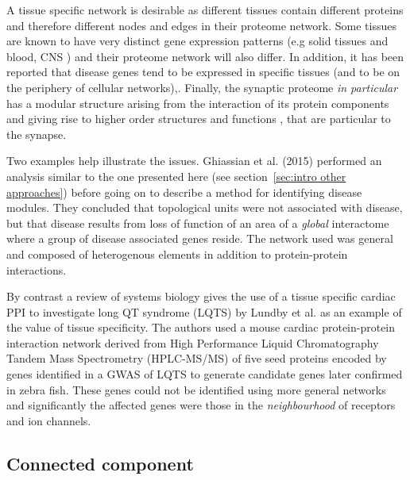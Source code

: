 A tissue specific network is desirable as different tissues contain different proteins and therefore different nodes and edges in their proteome network.  Some tissues are known to have very distinct gene expression patterns (e.g solid tissues and blood, CNS \cite{mele2015human}) and their proteome network will also differ. In addition, it has been reported that disease genes tend to be expressed in specific tissues (and to be on the periphery of cellular networks)\cite{barabasi2011network},\cite{kitsak2016tissue}. Finally, the synaptic proteome \textit{in particular} has a modular structure arising from the interaction of its protein components and giving rise to higher order structures and functions \cite{pocklington2006organization},\cite{grant2012synaptopathies} that are particular to the synapse. 

Two examples help illustrate the issues. Ghiassian et al. (2015)\cite{ghiassian2015disease} performed an analysis similar to the one presented here (see section~\ref{sec:intro other approaches}) before going on to describe a method for identifying disease modules. They concluded that topological units were not associated with disease, but that disease results from loss of function of an area of a \textit{global} interactome where a group of disease associated genes reside. The network used was general and composed of heterogenous elements in addition to protein-protein interactions. 

By contrast a review of systems biology \cite{parikshak2015systems} gives the use of a tissue specific cardiac PPI to investigate long QT syndrome (LQTS) by Lundby et al.\cite{lundby2014annotation} as an example of the value of tissue specificity. The authors used a mouse cardiac protein-protein interaction network derived from High Performance Liquid Chromatography Tandem Mass Spectrometry (HPLC-MS/MS) of five seed proteins encoded by genes identified in a GWAS of LQTS to generate candidate genes later confirmed in zebra fish. These genes could not be identified using more general networks and significantly the affected genes were those in the \textit{neighbourhood} of receptors and ion channels.


\subsection{Connected component}
\label{sec: PSP graph connected component and missing}

